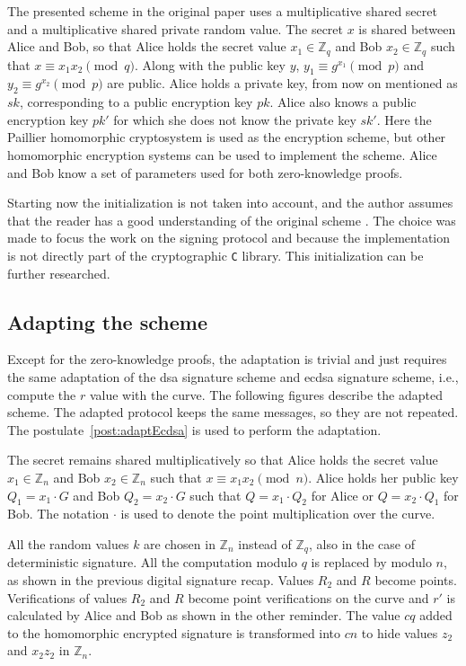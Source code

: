 The presented scheme in the original paper uses a multiplicative shared secret
and a multiplicative shared private random value. The secret $x$ is shared
between Alice and Bob, so that Alice holds the secret value $x_1 \in
\mathbb{Z}_{q}$ and Bob $x_2 \in \mathbb{Z}_{q}$ such that $x \equiv x_1x_2
\pmod q$. Along with the public key $y$, $y_1 \equiv g^{x_1} \pmod p$ and $y_2
\equiv g^{x_2} \pmod p$ are public. Alice holds a private key, from now on
mentioned as $sk$, corresponding to a public encryption key $pk$. Alice also
knows a public encryption key $pk'$ for which she does not know the private key
$sk'$. Here the Paillier homomorphic cryptosystem is used as the encryption
scheme, but other homomorphic encryption systems can be
used to implement the scheme. Alice and Bob know a set of parameters used for
both zero-knowledge proofs.

Starting now the initialization is not taken into account, and the author
assumes that the reader has a good understanding of the original scheme
\cite{crypto-2001-1592}. The choice was made to focus the work on the
signing protocol and because the implementation is not directly part of the
cryptographic \texttt{C} library. This initialization can be further researched.

\subsection{Adapting the scheme}

Except for the zero-knowledge proofs, the adaptation is trivial and just requires
the same adaptation of the \gls{dsa} signature scheme and \gls{ecdsa} signature
scheme, i.e., compute the $r$ value with the curve. The following figures
describe the adapted scheme. The adapted protocol keeps the same messages, so
they are not repeated. The postulate~\ref{post:adaptEcdsa} is used to perform
the adaptation.

The secret remains shared multiplicatively so that Alice holds the secret
value $x_1 \in \mathbb{Z}_{n}$ and Bob $x_2 \in \mathbb{Z}_{n}$ such that $x
\equiv x_1x_2 \pmod n$. Alice holds her public key $Q_1 = x_1 \cdot G$ and Bob
$Q_2 = x_2 \cdot G$ such that $Q = x_1 \cdot Q_2$ for Alice or $Q = x_2 \cdot
Q_1$ for Bob. The notation $\cdot$ is used to denote the point multiplication
over the curve.

All the random values $k$ are chosen in $\mathbb{Z}_{n}$ instead of
$\mathbb{Z}_{q}$, also in the case of deterministic signature. All the
computation modulo $q$ is replaced by modulo $n$, as shown in the previous
digital signature recap. Values $R_2$ and $R$ become points. Verifications of
values $R_2$ and $R$ become point verifications on the curve and $r'$ is
calculated by Alice and Bob as shown in the other reminder. The value $cq$ added
to the homomorphic encrypted signature is transformed into $cn$ to hide values
$z_2$ and $x_2z_2$ in $\mathbb{Z}_{n}$.

